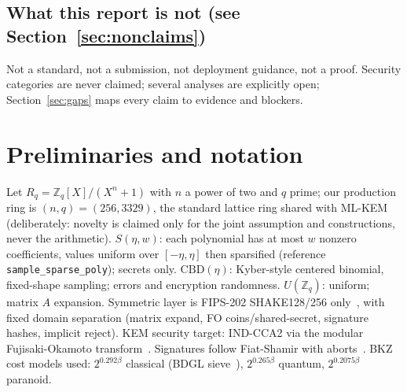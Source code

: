 \documentclass[11pt,a4paper]{article}
\begin{document}
\subsection{What this report is not (see Section~\ref{sec:nonclaims})}

Not a standard, not a submission, not deployment guidance, not a proof.
Security categories are never claimed; several analyses are explicitly
open; Section~\ref{sec:gaps} maps every claim to evidence and blockers.

\section{Preliminaries and notation}
\label{sec:prelim}

Let $R_q = \mathbb{Z}_q[X]/(X^n+1)$ with $n$ a power of two and $q$ prime;
our production ring is $(n,q)=(256,3329)$, the standard lattice ring shared
with ML-KEM~\cite{FIPS203} (deliberately: novelty is claimed only for the
joint assumption and constructions, never the arithmetic).
$S(\eta,w)$: each polynomial has at most $w$ nonzero coefficients, values
uniform over $[-\eta,\eta]$ then sparsified (reference
\texttt{sample\_sparse\_poly}); secrets only. $\mathrm{CBD}(\eta)$:
Kyber-style centered binomial, fixed-shape sampling; errors and encryption
randomness. $U(\mathbb{Z}_q)$: uniform; matrix $A$ expansion. Symmetric
layer is FIPS-202 SHAKE128/256 only~\cite{FIPS202}, with fixed domain
separation (matrix expand, FO coins/shared-secret, signature hashes,
implicit reject). KEM security target: IND-CCA2 via the modular
Fujisaki-Okamoto transform~\cite{HHK17}. Signatures follow Fiat-Shamir
with aborts~\cite{Lyu09,Lyu12}. BKZ cost models used:
$2^{0.292\beta}$ classical (BDGL sieve~\cite{BDGL16}), $2^{0.265\beta}$
quantum, $2^{0.2075\beta}$ paranoid.





\end{document}
